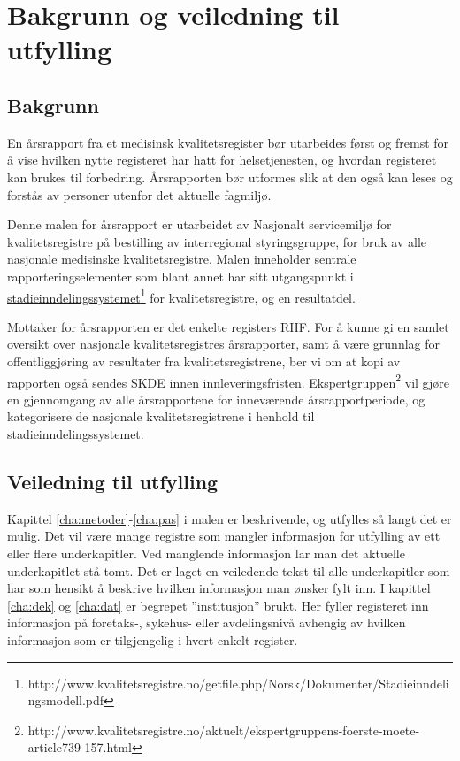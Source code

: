 \documentclass[norsk, a4paper, twocolumn]{report}
\begin{document}

\chapter*{Bakgrunn og veiledning til utfylling}

\section*{Bakgrunn}
En årsrapport fra et medisinsk kvalitetsregister bør utarbeides først og
fremst for å vise hvilken nytte registeret har hatt for helsetjenesten, og
hvordan registeret kan brukes til forbedring. Årsrapporten bør utformes slik
at den også kan leses og forstås av personer utenfor det aktuelle fagmiljø.

Denne malen for årsrapport er utarbeidet av Nasjonalt servicemiljø for
kvalitetsregistre på bestilling av interregional styringsgruppe, for bruk av alle
nasjonale medisinske kvalitetsregistre. Malen inneholder sentrale
rapporteringselementer som blant annet har sitt utgangspunkt i
\href{http://www.kvalitetsregistre.no/getfile.php/Norsk/Dokumenter/Stadieinndelingsmodell.pdf}{stadieinndelingssystemet}\footnote{http://www.kvalitetsregistre.no/getfile.php/Norsk/Dokumenter/Stadieinndelingsmodell.pdf}
for kvalitetsregistre, og en resultatdel.

Mottaker for årsrapporten er det enkelte registers RHF. For å kunne gi en
samlet oversikt over nasjonale kvalitetsregistres
årsrapporter, samt å være grunnlag for offentliggjøring av resultater fra
kvalitetsregistrene, ber vi om at kopi av rapporten også sendes SKDE innen
innleveringsfristen.
\href{http://www.kvalitetsregistre.no/aktuelt/ekspertgruppens-foerste-moete-article739-157.html}{Ekspertgruppen}\footnote{http://www.kvalitetsregistre.no/aktuelt/ekspertgruppens-foerste-moete-article739-157.html}
vil gjøre en gjennomgang av alle årsrapportene for inneværende
årsrapportperiode, og kategorisere de nasjonale kvalitetsregistrene i henhold
til stadieinndelingssystemet.



\section*{Veiledning til utfylling}

Kapittel \ref{cha:metoder}-\ref{cha:pas} i malen er beskrivende, og utfylles så
langt det er mulig. Det vil
være mange registre som mangler informasjon for utfylling av ett eller flere
underkapitler. Ved manglende informasjon lar man det aktuelle underkapitlet
stå tomt. Det er laget en veiledende tekst til alle underkapitler som har
som hensikt å beskrive hvilken informasjon man ønsker fylt inn. I kapittel
\ref{cha:dek} og \ref{cha:dat}
er begrepet ”institusjon” brukt. Her fyller registeret inn informasjon på
foretaks-, sykehus- eller avdelingsnivå avhengig av hvilken informasjon som er
tilgjengelig i hvert enkelt register. 
\end{document}
